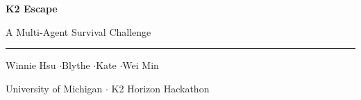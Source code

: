 \documentclass[10pt,aspectratio=169]{beamer}
\begin{document}

\begin{frame}[plain]
\vspace{1.3cm}
\begin{center}
{\fontsize{28}{32}\selectfont\color{accent}\bfseries K2 Escape\par}
\vspace{0.3cm}
{\large A Multi-Agent Survival Challenge\par}
\vspace{0.7cm}
{\color{accent!35}\rule{0.45\textwidth}{0.8pt}}
\vspace{0.6cm}

{\small Winnie Hsu \quad$\cdot$\quad Blythe \quad$\cdot$\quad Kate \quad$\cdot$\quad Wei Min\par}
\vspace{0.12cm}
{\small\color{midgray} University of Michigan \;$\cdot$\; K2 Horizon Hackathon}
\end{center}
\end{frame}

\end{document}
